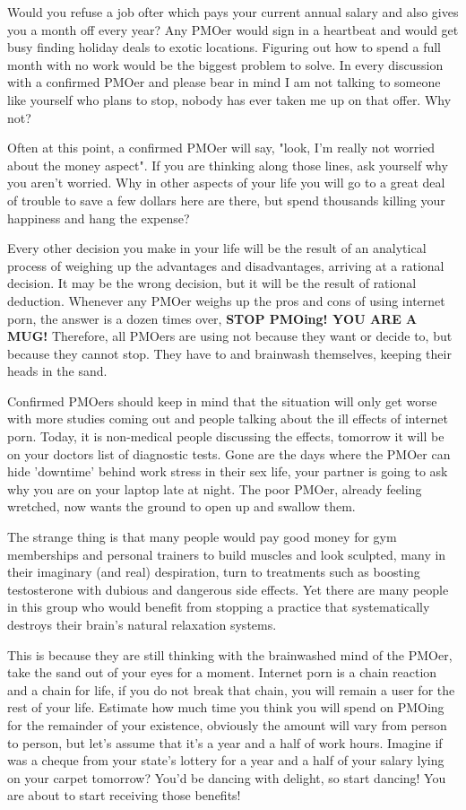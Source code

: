 Would you refuse a job ofter which pays your current annual salary and also gives you a month off every year? Any PMOer would sign in a heartbeat and would get busy finding holiday deals to exotic locations. Figuring out how to spend a full month with no work would be the biggest problem to solve. In every discussion with a confirmed PMOer and please bear in mind I am not talking to someone like yourself who plans to stop, nobody has ever taken me up on that offer. Why not?

Often at this point, a confirmed PMOer will say, "look, I'm really not worried about the money aspect". If you are thinking along those lines, ask yourself why you aren't worried. Why in other aspects of your life you will go to a great deal of trouble to save a few dollars here are there, but spend thousands killing your happiness and hang the expense?

Every other decision you make in your life will be the result of an analytical process of weighing up the advantages and disadvantages, arriving at a rational decision. It may be the wrong decision, but it will be the result of rational deduction. Whenever any PMOer weighs up the pros and cons of using internet porn, the answer is a dozen times over, \textbf{STOP PMOing! YOU ARE A MUG!} Therefore, all PMOers are using not because they want or decide to, but because they cannot stop. They have to and brainwash themselves, keeping their heads in the sand.

Confirmed PMOers should keep in mind that the situation will only get worse with more studies coming out and people talking about the ill effects of internet porn. Today, it is non-medical people discussing the effects, tomorrow it will be on your doctors list of diagnostic tests. Gone are the days where the PMOer can hide 'downtime' behind work stress in their sex life, your partner is going to ask why you are on your laptop late at night. The poor PMOer, already feeling wretched, now wants the ground to open up and swallow them.

The strange thing is that many people would pay good money for gym memberships and personal trainers to build muscles and look sculpted, many in their imaginary (and real) despiration, turn to treatments such as boosting testosterone with dubious and dangerous side effects. Yet there are many people in this group who would benefit from stopping a practice that systematically destroys their brain's natural relaxation systems.

This is because they are still thinking with the brainwashed mind of the PMOer, take the sand out of your eyes for a moment. Internet porn is a chain reaction and a chain for life, if you do not break that chain, you will remain a user for the rest of your life. Estimate how much time you think you will spend on PMOing for the remainder of your existence, obviously the amount will vary from person to person, but let's assume that it's a year and a half of work hours. Imagine if was a cheque from your state's lottery for a year and a half of your salary lying on your carpet tomorrow? You'd be dancing with delight, so start dancing! You are about to start receiving those benefits!


